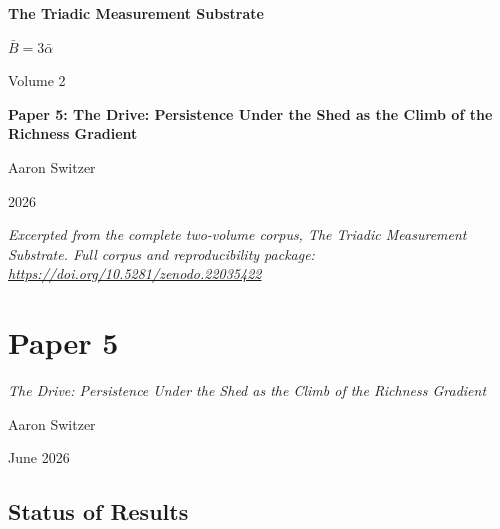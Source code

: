 \documentclass[11pt,oneside]{report}
\theoremstyle{definition}
\theoremstyle{remark}
\begin{document}
\thispagestyle{empty}
\begin{titlepage}
\centering
\vspace*{2cm}
{\sffamily\bfseries\Large The Triadic Measurement Substrate\par}
\vspace{0.6cm}
{\large $\bar{B} = 3\bar{\alpha}$\par}
\vspace{1cm}
{\sffamily\large Volume 2\par}
\vspace{1.4cm}
{\Large \bfseries Paper 5: The Drive: Persistence Under the Shed as the Climb of the Richness Gradient\par}
\vfill
{\large Aaron Switzer\par}
\vspace{0.4cm}
{\large 2026\par}
\vspace{1.2cm}
{\small\itshape Excerpted from the complete two-volume corpus, \emph{The Triadic Measurement Substrate}. Full corpus and reproducibility package: \url{https://doi.org/10.5281/zenodo.22035422}\par}
\end{titlepage}
\cleardoublepage
{}

\chapter*{Paper 5}
\begingroup\centering
{\large\itshape The Drive: Persistence Under the Shed as the Climb of the Richness Gradient\par}\vspace{0.8em}
{\normalsize Aaron Switzer\par}
{\small June 2026\par}
\endgroup\vspace{1.0em}

\par\vspace{0.6em}

\section*{Status of Results}
\end{document}
